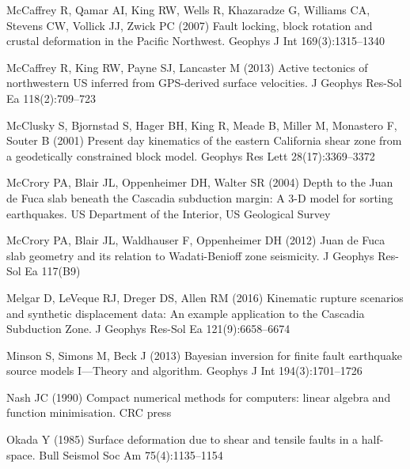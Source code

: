 {\begin{thebibliography}{33}
McCaffrey R, Qamar AI, King RW, Wells R, Khazaradze G, Williams CA, Stevens CW,
  Vollick JJ, Zwick PC (2007) Fault locking, block rotation and crustal
  deformation in the {P}acific {N}orthwest. Geophys J Int 169(3):1315--1340

McCaffrey R, King RW, Payne SJ, Lancaster M (2013) Active tectonics of
  northwestern {US} inferred from {GPS}-derived surface velocities. J Geophys
  Res-Sol Ea 118(2):709--723

McClusky S, Bjornstad S, Hager BH, King R, Meade B, Miller M, Monastero F,
  Souter B (2001) Present day kinematics of the eastern {C}alifornia shear zone
  from a geodetically constrained block model. Geophys Res Lett
  28(17):3369--3372

McCrory PA, Blair JL, Oppenheimer DH, Walter SR (2004) Depth to the {J}uan de
  {F}uca slab beneath the {C}ascadia subduction margin: A 3-{D} model for
  sorting earthquakes. {US} Department of the Interior, {US} Geological Survey

McCrory PA, Blair JL, Waldhauser F, Oppenheimer DH (2012) Juan de {F}uca slab
  geometry and its relation to {W}adati-{B}enioff zone seismicity. J Geophys
  Res-Sol Ea 117(B9)

Melgar D, LeVeque RJ, Dreger DS, Allen RM (2016) Kinematic rupture scenarios
  and synthetic displacement data: An example application to the {C}ascadia
  {S}ubduction {Z}one. J Geophys Res-Sol Ea 121(9):6658--6674

Minson S, Simons M, Beck J (2013) Bayesian inversion for finite fault
  earthquake source models {I}---{T}heory and algorithm. Geophys J Int
  194(3):1701--1726

Nash JC (1990) Compact numerical methods for computers: linear algebra and
  function minimisation. {CRC} press

Okada Y (1985) Surface deformation due to shear and tensile faults in a
  half-space. Bull Seismol Soc Am 75(4):1135--1154


\end{thebibliography}}
